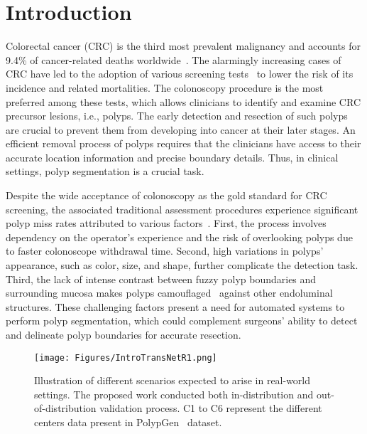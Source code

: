 \documentclass{midl} \usepackage{mwe}
\begin{document}
\section{Introduction}
Colorectal cancer (CRC) is the third most prevalent malignancy and accounts for 9.4\% of cancer-related deaths worldwide~\cite{sung2021global}. The alarmingly increasing cases of CRC have led to the adoption of various screening tests~\cite{kanth2021screening} to lower the risk of its incidence and related mortalities. The colonoscopy procedure is the most preferred among these tests, which allows clinicians to identify and examine CRC precursor lesions, i.e., polyps. The early detection and resection of such polyps are crucial to prevent them from developing into cancer at their later stages. An efficient removal process of polyps requires that the clinicians have access to their accurate location information and precise boundary details. Thus, in clinical settings, polyp segmentation is a crucial task. 

Despite the wide acceptance of colonoscopy as the gold standard for CRC screening, the associated traditional assessment procedures experience significant polyp miss rates attributed to various factors~\cite{kim2017miss}. First, the process involves dependency on the operator's experience and the risk of overlooking polyps due to faster colonoscope withdrawal time. Second, high variations in polyps' appearance, such as color, size, and shape, further complicate the detection task. Third, the lack of intense contrast between fuzzy polyp boundaries and surrounding mucosa makes polyps camouflaged~\cite{fan2021concealed} against other endoluminal structures. These challenging factors present a need for automated systems to perform polyp segmentation, which could complement surgeons' ability to detect and delineate polyp boundaries for accurate resection. 


\begin{figure}[!t]
\centering
\texttt{[image: Figures/IntroTransNetR1.png]} \caption{Illustration of different scenarios expected to arise in real-world settings. The proposed work conducted both in-distribution and out-of-distribution validation process. C1 to C6 represent the different centers data present in PolypGen~\cite{ali2021polypgen} dataset.}
\vspace{-5mm}
\label{fig:intro}
\end{figure}
\end{document}
